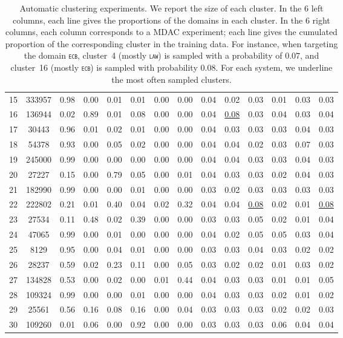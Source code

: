 \documentclass[12pt,a4paper,twoside]{report}
\theoremstyle{definition}
\newcommand{\domain}[1]{\texttt{\textsc{#1}}}
\begin{document}
\begin{table*}[htbp]
\begin{tabular}{|p{0.5cm}|*{7}{c|}|*{6}{c|}}
15&333957&0.98&0.00&0.01&0.01&0.00&0.00&0.04&0.02&0.03&0.01&0.03&0.03 \\
16&136944&0.02&0.89&0.01&0.08&0.00&0.00&0.04&\underline{0.08}&0.03&0.04&0.03&0.04 \\
17&30443&0.96&0.01&0.02&0.01&0.00&0.00&0.04&0.03&0.03&0.03&0.04&0.03 \\
18&54378&0.93&0.00&0.05&0.02&0.00&0.00&0.04&0.04&0.02&0.03&0.07&0.03 \\
19&245000&0.99&0.00&0.00&0.00&0.00&0.00&0.04&0.04&0.03&0.03&0.04&0.03 \\
20&27227&0.15&0.00&0.79&0.05&0.00&0.01&0.04&0.03&0.03&0.02&0.04&0.03 \\
21&182990&0.99&0.00&0.00&0.01&0.00&0.00&0.03&0.02&0.03&0.03&0.03&0.03 \\
22&222802&0.21&0.01&0.40&0.04&0.02&0.32&0.04&0.04&\underline{0.08}&0.02&0.01&\underline{0.08} \\
23&27534&0.11&0.48&0.02&0.39&0.00&0.00&0.03&0.03&0.05&0.02&0.01&0.04 \\
24&47065&0.99&0.00&0.01&0.00&0.00&0.00&0.04&0.02&0.05&0.05&0.03&0.04 \\
25&8129&0.95&0.00&0.04&0.01&0.00&0.00&0.03&0.03&0.04&0.03&0.02&0.02 \\
26&28237&0.59&0.02&0.23&0.11&0.00&0.05&0.03&0.02&0.02&0.01&0.03&0.02 \\
27&134828&0.53&0.00&0.02&0.00&0.01&0.44&0.04&0.03&0.03&0.01&0.01&0.05 \\
28&109324&0.99&0.00&0.00&0.01&0.00&0.00&0.04&0.03&0.03&0.02&0.01&0.02 \\
29&25561&0.56&0.16&0.08&0.16&0.00&0.04&0.03&0.03&0.03&0.02&0.02&0.03 \\
30&109260&0.01&0.06&0.00&0.92&0.00&0.00&0.03&0.03&0.03&0.06&0.04&0.04 \\
\hline
\end{tabular}
\caption{Automatic clustering experiments. We report the size of each cluster. In the 6 left columns, each line gives the proportions of the domains in each cluster. In the 6 right columns, each column corresponds to a MDAC experiment; each line gives the cumulated proportion of the corresponding cluster in the training data. For instance, when targeting the domain \domain{ecb}, cluster~4 (mostly \domain{law}) is sampled with a probability of $0.07$, and cluster~16 (mostly \domain{ecb}) is sampled with probability $0.08$. For each system, we underline the most often sampled clusters.}
\label{tab:automatic_domains}
\end{table*}
\end{document}
